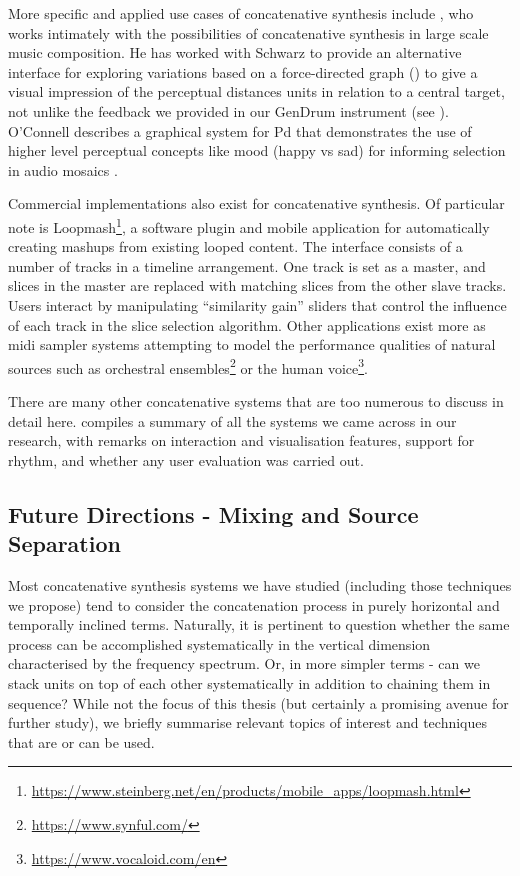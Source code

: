 More specific and applied use cases of concatenative synthesis include \cite{Hackbarth2010}, who works intimately with the possibilities of concatenative synthesis in large scale music composition. He has worked with Schwarz to provide an alternative interface for exploring variations based on a force-directed graph () to give a visual impression of the perceptual distances units in relation to a central target, not unlike the feedback we provided in our GenDrum instrument (see ). O’Connell describes a graphical system for Pd that demonstrates the use of higher level perceptual concepts like mood (happy vs sad) for informing selection in audio mosaics \citep{OConnell2011}.

Commercial implementations also exist for concatenative synthesis. Of particular note is Loopmash\footnote{\url{https://www.steinberg.net/en/products/mobile_apps/loopmash.html}}, a software plugin and mobile application for automatically creating mashups from existing looped content. The interface consists of a number of tracks in a timeline arrangement. One track is set as a master, and slices in the master are replaced with matching slices from the other slave tracks. Users interact by manipulating “similarity gain” sliders that control the influence of each track in the slice selection algorithm. Other applications exist more as \acrshort{midi} sampler systems attempting to model the performance qualities of natural sources such as orchestral ensembles\footnote{\url{https://www.synful.com/}} or the human voice\footnote{\url{https://www.vocaloid.com/en}}.

There are many other concatenative systems that are too numerous to discuss in detail here.  compiles a summary of all the systems we came across in our research, with remarks on interaction and visualisation features, support for rhythm, and whether any user evaluation was carried out.

\subsection{Future Directions - Mixing and Source Separation}

Most concatenative synthesis systems we have studied (including those techniques we propose) tend to consider the concatenation process in purely horizontal and temporally inclined terms.  Naturally, it is pertinent to question whether the same process can be accomplished systematically in the vertical dimension characterised by the frequency spectrum. Or, in more simpler terms - can we stack units on top of each other systematically in addition to chaining them in sequence? While not the focus of this thesis (but certainly a promising avenue for further study), we briefly summarise relevant topics of interest and  techniques that are or can be used.

